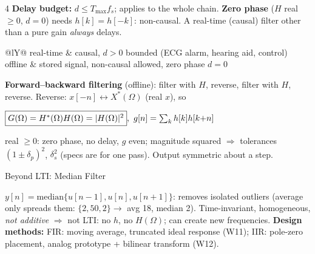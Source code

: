 \documentclass[a4paper,landscape]{article}
\newcommand{\sub}[1]{\par\vspace{0.6pt}\noindent\colorbox{subblue}{\parbox{\dimexpr\linewidth-2\fboxsep}{\bfseries\strut #1}}\par\vspace{0.2pt}}
\newcommand{\bx}[1]{\fbox{$\textstyle #1$}}
\newcommand{\eqc}[1]{\par\vspace{0.2pt}\centerline{$#1$}\par\vspace{0.2pt}}
\begin{document}
\begin{multicols*}{4}
\textbf{Delay budget:} $d\le T_{\max}f_s$; applies to the whole chain.
\textbf{Zero phase} ($H$ real $\ge0$, $d=0$) needs $h[k]=h[-k]$: non-causal. A real-time (causal) filter other than a pure gain \emph{always} delays.
\begin{tabularx}{\linewidth}{@{}lY@{}}
real-time & causal, $d>0$ bounded (ECG alarm, hearing aid, control)\\
offline & stored signal, non-causal allowed, zero phase $d=0$
\end{tabularx}
\textbf{Forward--backward filtering} (offline): filter with $H$, reverse, filter with $H$, reverse. Reverse: $x[-n]\leftrightarrow X^*(\Omega)$ (real $x$), so
\eqc{\bx{G(\Omega)=H^*(\Omega)H(\Omega)=|H(\Omega)|^2},\ g[n]=\textstyle\sum_kh[k]h[k{+}n]}
real $\ge0$: zero phase, no delay, $g$ even; magnitude squared $\Rightarrow$ tolerances $(1\pm\delta_p)^2$, $\delta_s^2$ (specs are for one pass). Output symmetric about a step.
\sub{Beyond LTI: Median Filter}
$y[n]=\mathrm{median}\{u[n{-}1],u[n],u[n{+}1]\}$: removes isolated outliers (average only spreads them: $\{2,50,2\}\to$ avg 18, median 2). Time-invariant, homogeneous, \emph{not additive} $\Rightarrow$ not LTI: no $h$, no $H(\Omega)$; can create new frequencies.
\textbf{Design methods:} FIR: moving average, truncated ideal response (W11); IIR: pole-zero placement, analog prototype + bilinear transform (W12).
\end{multicols*}
\end{document}
